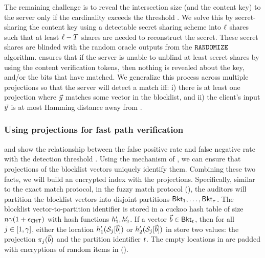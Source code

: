 The remaining challenge is to reveal the intersection 
size (and the content key) to the server only if the cardinality exceeds the threshold \threshold. We solve this by secret-sharing the content key using a detectable secret sharing scheme \dssProtocol into $\ell$ shares such that at least $\ell - T$ shares are needed to reconstruct the secret. These secret shares are blinded with the random oracle outputs from the $\randomize$ algorithm. \dssProtocol ensures that if the server is unable to unblind at least \threshold secret shares by using the content verification tokens, then nothing is revealed about the key, and/or the bits that have matched. We generalize this process across multiple projections so that the server will detect a match iff: i) there is at least one projection where $\clientVec$ matches some vector \blocklistVec in the blocklist, and ii) the client's input $\clientVec$ is at most \threshold Hamming distance away from \blocklistVec. 



\subsubsection{Using projections for fast path verification}
%
 and  show the relationship between the false positive rate and false negative rate with the detection threshold \detectionThreshold. Using the mechanism of \cite{chongchitmate2024approximate}, we can ensure that projections of the blocklist vectors uniquely identify them. Combining these two facts, we will build an encrypted index with the projections. Specifically, similar to the exact match protocol, in the fuzzy match protocol (), the auditors will partition the blocklist vectors into \numBuckets disjoint partitions $\mathsf{Bkt}_{1}, \dots, \mathsf{Bkt}_{\tau}$. The blocklist vector-to-partition identifier is stored in a cuckoo hash table \cuckooTable of size $n \gamma(1+\epsilon_{\mathsf{CHT}})$ with hash functions $\cuckooHashFn{1}, \cuckooHashFn{2}$. If a vector $\blocklistVec \in \bucket{\bucketIdx}$, then for all $\projIdx \in \nats[1, \numProjections]$, either the location $\cuckooHashFn{1}(\genericSetVar[\projIdx][\blocklistVec])$ or $\cuckooHashFn{2}(\genericSetVar[\projIdx][\blocklistVec])$ in \cuckooTable store two values: the projection $\projFn[\projIdx](\blocklistVec)$ and the partition identifier $t$. The empty locations in \cuckooTable are padded with encryptions of random items in \group (). 


